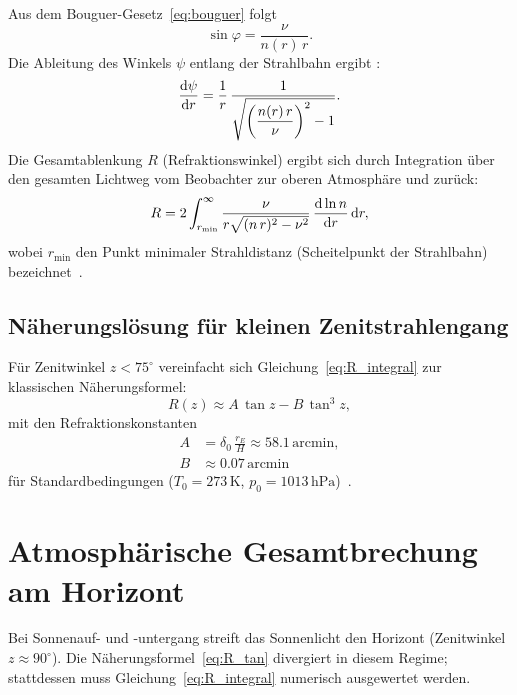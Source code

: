 \documentclass[12pt,a4paper]{article}
\providecommand{\SI}[2]{\ensuremath{#1\,#2}}
\providecommand{\ang}[1]{\ensuremath{#1\,\mathrm{arcmin}}}
\providecommand{\hecto}{\mathrm{h}}
\providecommand{\pascal}{\mathrm{Pa}}
\providecommand{\kelvin}{\mathrm{K}}
\begin{document}
Aus dem Bouguer-Gesetz~\eqref{eq:bouguer} folgt
\begin{equation}
  \sin\varphi = \frac{\nu}{n(r)\,r}.
  \label{eq:sin_phi}
\end{equation}
Die Ableitung des Winkels $\psi$ entlang der Strahlbahn ergibt
\citep{Ramsauer1932}:
\begin{equation}
  \dv{\psi}{r} = \frac{1}{r}\,
  \frac{1}{\sqrt{ \left(\dfrac{n(r)\,r}{\nu}\right)^{2} - 1 }}.
  \label{eq:dpsi_dr}
\end{equation}
Die Gesamtablenkung $R$ (Refraktionswinkel) ergibt sich durch
Integration über den gesamten Lichtweg vom Beobachter
zur oberen Atmosphäre und zurück:
\begin{equation}
  R = 2\int_{r_{\min}}^{\infty}
  \frac{\nu}{r\sqrt{(n\,r)^{2}-\nu^{2}}}\,
  \dv{\ln n}{r}\,\dd r,
  \label{eq:R_integral}
\end{equation}
wobei $r_{\min}$ den Punkt minimaler Strahldistanz
(Scheitelpunkt der Strahlbahn) bezeichnet~\citep{Hohenkerk1988}.

\subsection{Näherungslösung für kleinen Zenitstrahlengang}

Für Zenitwinkel $z < 75^{\circ}$ vereinfacht sich Gleichung~\eqref{eq:R_integral}
zur klassischen Näherungsformel:
\begin{equation}
  R(z) \approx A\,\tan z - B\,\tan^{3} z,
  \label{eq:R_tan}
\end{equation}
mit den Refraktionskonstanten
\begin{align}
  A &= \delta_0\,\frac{r_E}{H} \approx \ang{58.1}, \\
  B &\approx \ang{0.07}
\end{align}
für Standardbedingungen ($T_0 = \SI{273}{\kelvin}$,
$p_0 = \SI{1013}{\hecto\pascal}$)~\citep{Meeus1991}.

\section{Atmosphärische Gesamtbrechung am Horizont}
\label{sec:brechung_horizont}

Bei Sonnenauf- und -untergang streift das Sonnenlicht den Horizont
(Zenitwinkel $z \approx 90^{\circ}$).
Die Näherungsformel~\eqref{eq:R_tan} divergiert in diesem Regime;
stattdessen muss Gleichung~\eqref{eq:R_integral} numerisch ausgewertet
werden.
\end{document}
